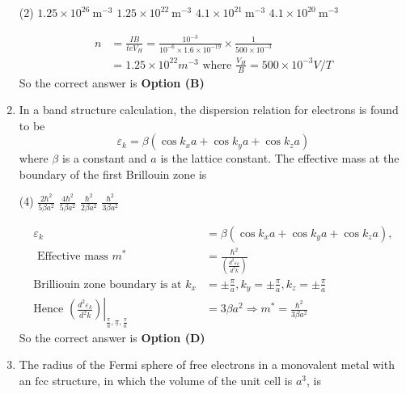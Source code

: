 \begin{enumerate}
	{}
	\begin{tasks}(2)
		\task[\textbf{A.}] $1.25 \times 10^{26} \mathrm{~m}^{-3}$
		\task[\textbf{B.}] $1.25 \times 10^{22} \mathrm{~m}^{-3}$
		\task[\textbf{C.}] $4.1 \times 10^{21} \mathrm{~m}^{-3}$
		\task[\textbf{D.}] $4.1 \times 10^{20} \mathrm{~m}^{-3}$
	\end{tasks}
	\begin{answer}
		\begin{align*}
		n&=\frac{I B}{t e V_{H}}=\frac{10^{-3}}{10^{-6} \times 1.6 \times 10^{-19}} \times \frac{1}{500 \times 10^{-3}}\\&=1.25 \times 10^{22} m^{-3}\text{ where }\frac{V_{H}}{B}=500 \times 10^{-3} V / T
		\end{align*}
		So the correct answer is \textbf{Option (B)}
	\end{answer}
	\item In a band structure calculation, the dispersion relation for electrons is found to be
	$$
	\varepsilon_{k}=\beta\left(\cos k_{x} a+\cos k_{y} a+\cos k_{z} a\right)
	$$
	where $\beta$ is a constant and $a$ is the lattice constant. The effective mass at the boundary of the first Brillouin zone is
	{}
	\begin{tasks}(4)
		\task[\textbf{A.}] $\frac{2 \hbar^{2}}{5 \beta a^{2}}$
		\task[\textbf{B.}] $\frac{4 \hbar^{2}}{5 \beta a^{2}}$
		\task[\textbf{C.}] $\frac{\hbar^{2}}{2 \beta a^{2}}$
		\task[\textbf{D.}] $\frac{\hbar^{2}}{3 \beta a^{2}}$
	\end{tasks}
	\begin{answer}
		\begin{align*}
		\varepsilon_{k}&=\beta\left(\cos k_{x} a+\cos k_{y} a+\cos k_{z} a\right),\\\text{ Effective mass }m^{*}&=\frac{\hbar^{2}}{\left(\frac{d^{2} \varepsilon_{k}}{d^{2} k}\right)}\\
		\text{Brilliouin zone boundary is at }k_{x}&=\pm \frac{\pi}{a}, k_{y}=\pm \frac{\pi}{a}, k_{z}=\pm \frac{\pi}{a}\\
		\text{Hence }\left.\left(\frac{d^{2} \varepsilon_{k}}{d^{2} k}\right)\right|_{\frac{\pi}{a}, \underline{\pi}, \frac{\pi}{a}}&=3 \beta a^{2} \Rightarrow m^{*}=\frac{\hbar^{2}}{3 \beta a^{2}}
		\end{align*}
		So the correct answer is \textbf{Option (D)}
	\end{answer}
	\item The radius of the Fermi sphere of free electrons in a monovalent metal with an $\mathrm{fcc}$ structure, in which the volume of the unit cell is $a^{3}$, is

\end{enumerate}
